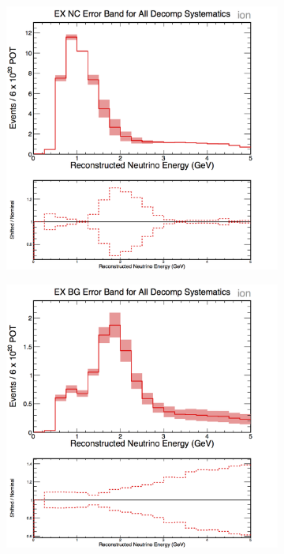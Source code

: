 \begin{figure}[h]
  \centering
  \begin{subfigure}{.48\textwidth}
    \centering
    \includegraphics[width=1\linewidth]{figures/cNCEXDecompSysts.png}
  \end{subfigure}
  \begin{subfigure}{.48\textwidth}
    \centering
    \includegraphics[width=1\linewidth]{figures/cBGEXDecompSysts.png}

\end{subfigure}
\end{figure}
